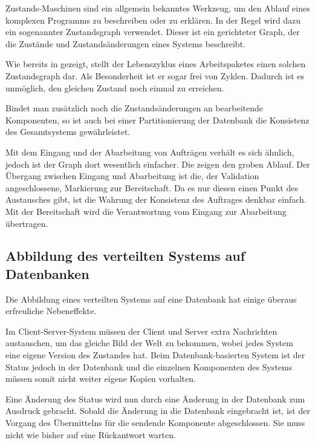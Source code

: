 \nocite{statechart}

Zustands-Maschinen sind ein allgemein bekanntes Werkzeug,
um den Ablauf eines komplexen Programms zu beschreiben oder zu erklären.
In der Regel wird dazu ein sogenannter Zustandsgraph verwendet.
Dieser ist ein gerichteter Graph, der die Zustände und Zustandsänderungen eines Systems beschreibt.

Wie bereits in  gezeigt,
stellt der Lebenszyklus eines Arbeitspaketes einen solchen Zustandsgraph dar.
Als Besonderheit ist er sogar frei von Zyklen.
Dadurch ist es unmöglich, den gleichen Zustand noch einmal zu erreichen.

Bindet man zusätzlich noch die Zustandsänderungen an bearbeitende Komponenten,
so ist auch bei einer Partitionierung der Datenbank die Konsistenz des Gesamtsystems gewährleistet.


Mit dem Eingang und der Abarbeitung von Aufträgen verhält es sich ähnlich,
jedoch ist der Graph dort wesentlich einfacher.
Die  zeigen den groben Ablauf.
Der Übergang zwischen Eingang und Abarbeitung ist die, der Validation angeschlossene, Markierung zur Bereitschaft.
Da es nur diesen einen Punkt des Austausches gibt, ist die Wahrung der Konsistenz des Auftrages denkbar einfach.
Mit der Bereitschaft wird die Verantwortung vom Eingang zur Abarbeitung übertragen.

\subsection{Abbildung des verteilten Systems auf Datenbanken}

Die Abbildung eines verteilten Systems auf eine Datenbank
hat einige überaus erfreuliche Nebeneffekte.

Im Client-Server-System müssen der Client und Server extra Nachrichten austauschen, um das gleiche Bild der Welt zu bekommen, wobei jedes System eine eigene Version des Zustandes hat.
Beim Datenbank-basierten System ist der Status jedoch in der Datenbank und
die einzelnen Komponenten des Systems müssen somit nicht weiter eigene Kopien vorhalten.

Eine Änderung des Status wird nun durch eine Änderung in der Datenbank zum Ausdruck gebracht.
Sobald die Änderung in die Datenbank eingebracht ist,
ist der Vorgang des Übermittelns für die sendende Komponente abgeschlossen.
Sie muss nicht wie bisher auf eine Rückantwort warten.


